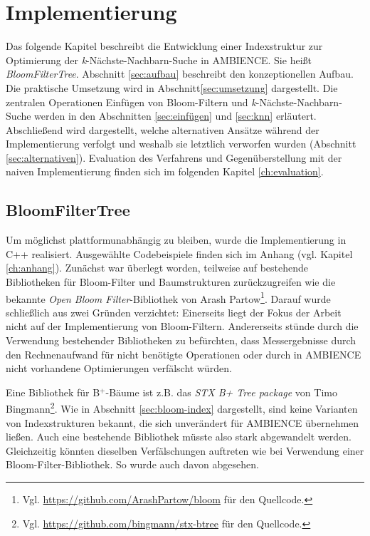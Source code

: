 \chapter{Implementierung}\label{ch:implementierung}
Das folgende Kapitel beschreibt die Entwicklung einer Indexstruktur zur Optimierung der \textit{k}-Nächste-Nachbarn-Suche in AMBIENCE. Sie heißt \textit{BloomFilterTree}. Abschnitt \ref{sec:aufbau} beschreibt den konzeptionellen Aufbau. Die praktische Umsetzung wird in Abschnitt\ref{sec:umsetzung} dargestellt. Die zentralen Operationen Einfügen von Bloom-Filtern und \textit{k}-Nächste-Nachbarn-Suche werden in den Abschnitten \ref{sec:einfügen} und \ref{sec:knn} erläutert. Abschließend wird dargestellt, welche alternativen Ansätze während der Implementierung verfolgt und weshalb sie letztlich verworfen wurden (Abschnitt \ref{sec:alternativen}). Evaluation des Verfahrens und Gegenüberstellung mit der naiven Implementierung finden sich im folgenden Kapitel \ref{ch:evaluation}.  
\section{BloomFilterTree}\label{sec:bloom-filter-tree}
Um möglichst plattformunabhängig zu bleiben, wurde die Implementierung in C++ realisiert. Ausgewählte Codebeispiele finden sich im Anhang (vgl. Kapitel \ref{ch:anhang}). Zunächst war überlegt worden, teilweise auf bestehende Bibliotheken für Bloom-Filter und Baumstrukturen zurückzugreifen wie die bekannte \textit{Open Bloom Filter}-Bibliothek von Arash Partow\footnote{Vgl. \url{https://github.com/ArashPartow/bloom} für den Quellcode.}. Darauf wurde schließlich aus zwei Gründen verzichtet: Einerseits liegt der Fokus der Arbeit nicht auf der Implementierung von Bloom-Filtern. Andererseits stünde durch die Verwendung bestehender Bibliotheken zu befürchten, dass Messergebnisse durch den Rechnenaufwand für nicht benötigte Operationen oder durch in AMBIENCE nicht vorhandene Optimierungen verfälscht würden. 

Eine Bibliothek für B$^+$-Bäume ist z.B. das \textit{STX B+ Tree package} von Timo Bingmann\footnote{Vgl. \url{https://github.com/bingmann/stx-btree} für den Quellcode.}. Wie in Abschnitt \ref{sec:bloom-index} dargestellt, sind keine Varianten von Indexstrukturen bekannt, die sich unverändert für AMBIENCE übernehmen ließen. Auch eine bestehende Bibliothek müsste also stark abgewandelt werden. Gleichzeitig könnten dieselben Verfälschungen auftreten wie bei Verwendung einer Bloom-Filter-Bibliothek. So wurde auch davon abgesehen.
